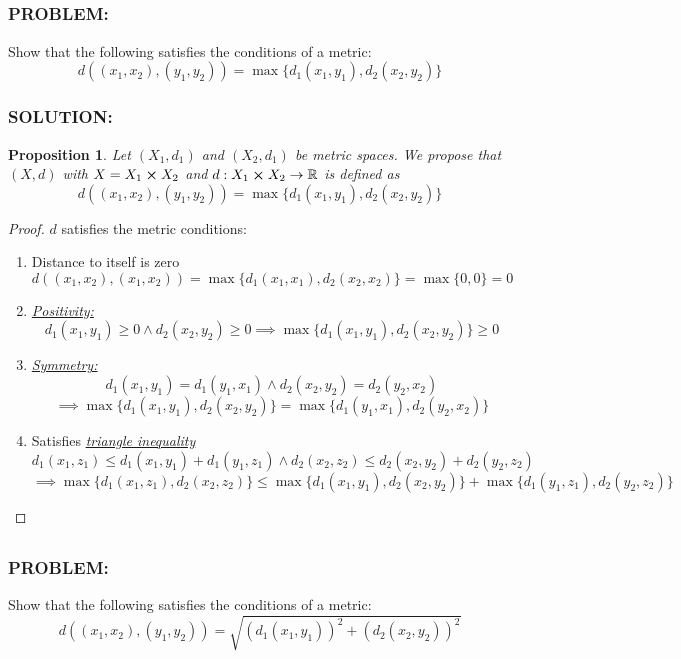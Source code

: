 \documentclass[]{article}
\newcommand{\Problem}{\subsubsection*{\textbf{PROBLEM:}}}
\newcommand{\Solution}{\subsubsection*{\textbf{SOLUTION:}}}
\newcommand{\R}{\mathbb{R}}
\newtheorem{proposition}{Proposition}
\begin{document}
\subsection{}
\Problem
Show that the following satisfies the conditions of a metric: \[
    d((x_1, x_2), (y_1, y_2)) = \max\{d_1(x_1,y_1), d_2(x_2,y_2)\}
\]

\Solution
\begin{proposition}
    Let $(X_1,d_1)$ and $(X_2,d_1)$ be metric spaces.
    We propose that $(X, d)$ with $X = X_1 \cross X_2$ and $d :  X_1 \cross X_2 \to \R$ is defined as \[
        d((x_1, x_2), (y_1, y_2)) = \max\{d_1(x_1,y_1), d_2(x_2,y_2)\}
    \]
\end{proposition}
\begin{proof}
    $d$ satisfies the metric conditions:
    \begin{enumerate}
        \item Distance to itself is zero \[
            d((x_1, x_2), (x_1, x_2)) = \max\{d_1(x_1,x_1), d_2(x_2,x_2)\} = \max\{0, 0\} = 0
        \] \item \emph{\underline{Positivity:}} \[
            d_1(x_1,y_1) \geq 0 \land d_2(x_2, y_2) \geq 0 \implies \max\{d_1(x_1,y_1), d_2(x_2,y_2)\} \geq 0
        \]
         \item \emph{\underline{Symmetry:}} \[
            d_1(x_1,y_1) = d_1(y_1,x_1) \land d_2(x_2, y_2) = d_2(y_2,x_2)
        \]\[
            \implies \max\{d_1(x_1,y_1), d_2(x_2,y_2)\} = \max\{d_1(y_1,x_1), d_2(y_2,x_2)\}
        \] \item Satisfies \emph{\underline{triangle inequality}} \[
            d_1(x_1,z_1) \leq d_1(x_1,y_1) + d_1(y_1,z_1) \land d_2(x_2,z_2) \leq d_2(x_2,y_2) + d_2(y_2,z_2) 
        \]\[    
            \implies \max\{d_1(x_1,z_1), d_2(x_2,z_2)\} \leq \max\{d_1(x_1,y_1), d_2(x_2,y_2)\} + \max\{d_1(y_1,z_1), d_2(y_2,z_2)\}
        \]
    \end{enumerate}
\end{proof}

\subsection{}
\Problem
Show that the following satisfies the conditions of a metric: \[
    d((x_1, x_2), (y_1, y_2)) = \sqrt{(d_1(x_1,y_1))^2 + (d_2(x_2,y_2))^2}
\]
\end{document}
